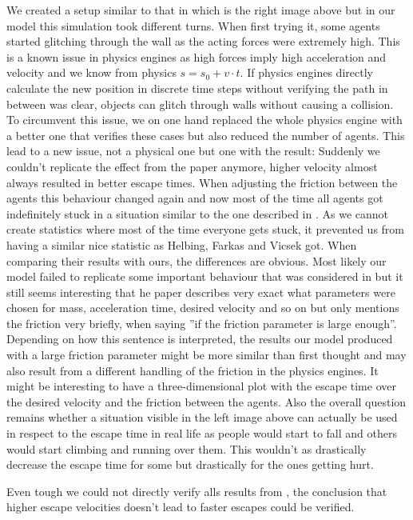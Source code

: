 \documentclass[11pt]{article}
\begin{document}
We created a setup similar to that in \cite{Helbing} which is the right image above but in our model this simulation took different turns. When first trying it, some agents started glitching through the wall as the acting forces were extremely high. This is a known issue in physics engines as high forces imply high acceleration and velocity and we know from physics $s = s_0 + v\cdot t$. If physics engines directly calculate the new position in discrete time steps without verifying the path in between was clear, objects can glitch through walls without causing a collision. To circumvent this issue, we on one hand replaced the whole physics engine with a better one that verifies these cases but also reduced the number of agents. This lead to a new issue, not a physical one but one with the result: Suddenly we couldn't replicate the effect from the paper anymore, higher velocity almost always resulted in better escape times. When adjusting the friction between the agents this behaviour changed again and now most of the time all agents got indefinitely stuck in a situation similar to the one described in \cite{Helbing}. As we cannot create statistics where most of the time everyone gets stuck, it prevented us from having a similar nice statistic as Helbing, Farkas and Vicsek got. When comparing their results with ours, the differences are obvious. Most likely our model failed to replicate some important behaviour that was considered in \cite{Helbing} but it still seems interesting that he paper describes very exact what parameters were chosen for mass, acceleration time, desired velocity and so on but only mentions the friction very briefly, when saying ''if the friction parameter is large enough''\cite{Helbing}. Depending on how this sentence is interpreted, the results our model produced with a large friction parameter might be more similar than first thought and may also result from a different handling of the friction in the physics engines. It might be interesting to have a three-dimensional plot with the escape time over the desired velocity and the friction between the agents. Also the overall question remains whether a situation visible in the left image above can actually be used in respect to the escape time in real life as people would start to fall and others would start climbing and running over them. This wouldn't as drastically decrease the escape time for some but drastically for the ones getting hurt.

Even tough we could not directly verify alls results from \cite{Helbing}, the conclusion that higher escape velocities doesn't lead to faster escapes could be verified.
\end{document}

